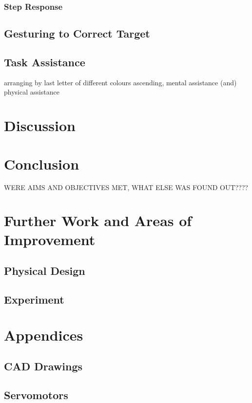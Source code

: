 \documentclass[11pt]{article}
\begin{document}
\subsubsection{Step Response}

\subsection{Gesturing to Correct Target}

\subsection{Task Assistance}
arranging by last letter of different colours ascending, mental assistance (and) physical assistance

\section{Discussion}
\section{Conclusion}
WERE AIMS AND OBJECTIVES MET, WHAT ELSE WAS FOUND OUT????
\section{Further Work and Areas of Improvement}
\subsection{Physical Design}
\subsection{Experiment}

\pagebreak



\pagebreak
\section{Appendices}
\subsection{CAD Drawings}
\subsection{Servomotors}
\end{document}
